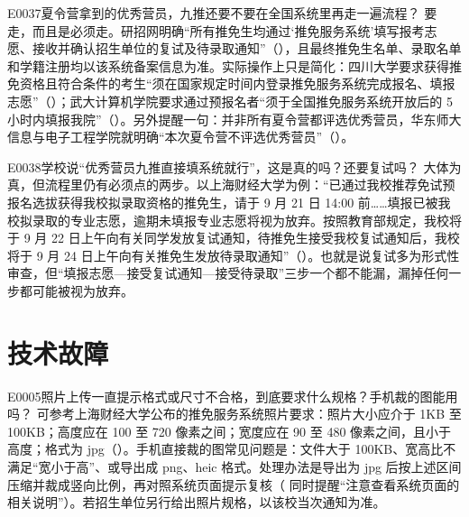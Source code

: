 \begin{qa}{E0037}{夏令营拿到的优秀营员，九推还要不要在全国系统里再走一遍流程？}
要走，而且是必须走。研招网明确“所有推免生均通过‘推免服务系统’填写报考志愿、接收并确认招生单位的复试及待录取通知”（），且最终推免生名单、录取名单和学籍注册均以该系统备案信息为准。实际操作上只是简化：四川大学要求获得推免资格且符合条件的考生“须在国家规定时间内登录推免服务系统完成报名、填报志愿”（）；武大计算机学院要求通过预报名者“须于全国推免服务系统开放后的 5 小时内填报我院”（）。另外提醒一句：并非所有夏令营都评选优秀营员，华东师大信息与电子工程学院就明确“本次夏令营不评选优秀营员”（）。
\end{qa}

\begin{qa}{E0038}{学校说“优秀营员九推直接填系统就行”，这是真的吗？还要复试吗？}
大体为真，但流程里仍有必须点的两步。以上海财经大学为例：“已通过我校推荐免试预报名选拔获得我校拟录取资格的推免生，请于 9 月 21 日 14:00 前……填报已被我校拟录取的专业志愿，逾期未填报专业志愿将视为放弃。按照教育部规定，我校将于 9 月 22 日上午向有关同学发放复试通知，待推免生接受我校复试通知后，我校将于 9 月 24 日上午向有关推免生发放待录取通知”（）。也就是说复试多为形式性审查，但“填报志愿—接受复试通知—接受待录取”三步一个都不能漏，漏掉任何一步都可能被视为放弃。
\end{qa}

\section{技术故障}
\begin{qa}{E0005}{照片上传一直提示格式或尺寸不合格，到底要求什么规格？手机裁的图能用吗？}
可参考上海财经大学公布的推免服务系统照片要求：照片大小应介于 1KB 至 100KB；高度应在 100 至 720 像素之间；宽度应在 90 至 480 像素之间，且小于高度；格式为 jpg（）。手机直接裁的图常见问题是：文件大于 100KB、宽高比不满足“宽小于高”、或导出成 png、heic 格式。处理办法是导出为 jpg 后按上述区间压缩并裁成竖向比例，再对照系统页面提示复核（ 同时提醒“注意查看系统页面的相关说明”）。若招生单位另行给出照片规格，以该校当次通知为准。
\end{qa}

